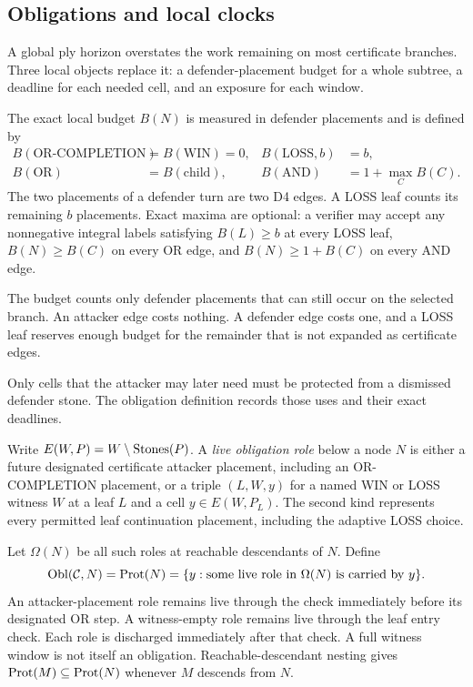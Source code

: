 \subsection{Obligations and local clocks}

A global ply horizon overstates the work remaining on most certificate
branches.  Three local objects replace it: a defender-placement budget for a
whole subtree, a deadline for each needed cell, and an exposure for each
window.

\begin{definition}
\label{def:D14}
The exact local budget $B(N)$ is measured in defender placements and is
defined by
\[
\begin{aligned}
B(\text{OR-COMPLETION})&=B(\text{WIN})=0,
&B(\text{LOSS},b)&=b,\\
B(\text{OR})&=B(\text{child}),
&B(\text{AND})&=1+\max_C B(C).
\end{aligned}
\]
The two placements of a defender turn are two D4 edges.  A LOSS leaf counts
its remaining $b$ placements.  Exact maxima are optional: a verifier may
accept any nonnegative integral labels satisfying $B(L)\ge b$ at every LOSS
leaf, $B(N)\ge B(C)$ on every OR edge, and
$B(N)\ge1+B(C)$ on every AND edge.
\end{definition}

\begin{plainterms}
The budget counts only defender placements that can still occur on the
selected branch.  An attacker edge costs nothing.  A defender edge costs one,
and a LOSS leaf reserves enough budget for the remainder that is not expanded
as certificate edges.
\end{plainterms}

Only cells that the attacker may later need must be protected from a
dismissed defender stone.  The obligation definition records those uses and
their exact deadlines.

\begin{definition}
\label{def:D10}
Write $E(W,P)=W\setminus\operatorname{Stones}(P)$.  A \emph{live obligation role} below a
node $N$ is either a future designated certificate attacker placement,
including an OR-COMPLETION placement, or a triple $(L,W,y)$ for a named WIN
or LOSS witness $W$ at a leaf $L$ and a cell $y\in E(W,P_L)$.  The second kind
represents every permitted leaf continuation placement, including the
adaptive LOSS choice.

Let $\Omega(N)$ be all such roles at reachable descendants of $N$.  Define
\[
  \operatorname{Obl}(\mathcal C,N)=\operatorname{Prot}(N)
  =\{y:\text{some live role in $\Omega(N)$ is carried by $y$}\}.
\]
An attacker-placement role remains live through the check immediately before
its designated OR step.  A witness-empty role remains live through the leaf
entry check.  Each role is discharged immediately after that check.  A full
witness window is not itself an obligation.  Reachable-descendant nesting
gives $\operatorname{Prot}(M)\subseteq\operatorname{Prot}(N)$ whenever $M$ descends from $N$.
\end{definition}


